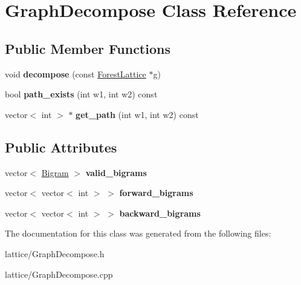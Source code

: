 \hypertarget{class_graph_decompose}{
\section{GraphDecompose Class Reference}
\label{class_graph_decompose}
}
\subsection*{Public Member Functions}
\begin{DoxyCompactItemize}
\item 
\hypertarget{class_graph_decompose_a671b195e2a0eff48eeefcee64d40fcb1}{
void {\bfseries decompose} (const \hyperlink{class_forest_lattice}{ForestLattice} $\ast$g)}
\label{class_graph_decompose_a671b195e2a0eff48eeefcee64d40fcb1}

\item 
\hypertarget{class_graph_decompose_a8e85b51d78e6bd961bbff6d121399ba7}{
bool {\bfseries path\_\-exists} (int w1, int w2) const }
\label{class_graph_decompose_a8e85b51d78e6bd961bbff6d121399ba7}

\item 
\hypertarget{class_graph_decompose_a48e47d62512330c280ed8a89bafe3e10}{
vector$<$ int $>$ $\ast$ {\bfseries get\_\-path} (int w1, int w2) const }
\label{class_graph_decompose_a48e47d62512330c280ed8a89bafe3e10}

\end{DoxyCompactItemize}
\subsection*{Public Attributes}
\begin{DoxyCompactItemize}
\item 
\hypertarget{class_graph_decompose_afbeb52935da971f4bc27f0e80ed48d33}{
vector$<$ \hyperlink{struct_bigram}{Bigram} $>$ {\bfseries valid\_\-bigrams}}
\label{class_graph_decompose_afbeb52935da971f4bc27f0e80ed48d33}

\item 
\hypertarget{class_graph_decompose_aca254d25cf0f2d2ad0d58a5775a297a8}{
vector$<$ vector$<$ int $>$ $>$ {\bfseries forward\_\-bigrams}}
\label{class_graph_decompose_aca254d25cf0f2d2ad0d58a5775a297a8}

\item 
\hypertarget{class_graph_decompose_a2b5c495d7725ccd63c0c3d2590ebd1e1}{
vector$<$ vector$<$ int $>$ $>$ {\bfseries backward\_\-bigrams}}
\label{class_graph_decompose_a2b5c495d7725ccd63c0c3d2590ebd1e1}

\end{DoxyCompactItemize}


The documentation for this class was generated from the following files:\begin{DoxyCompactItemize}
\item 
lattice/GraphDecompose.h\item 
lattice/GraphDecompose.cpp\end{DoxyCompactItemize}
